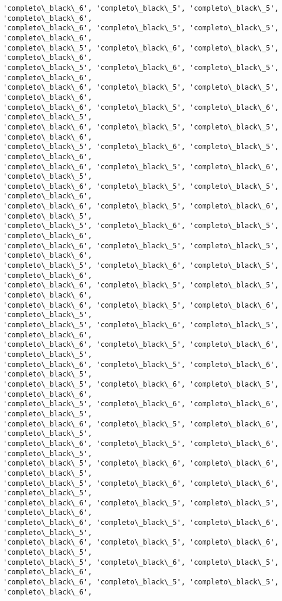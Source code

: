 \documentclass[11pt]{article}
\begin{document}
\begin{Verbatim}[commandchars=\\\{\}]
'completo\_black\_6', 'completo\_black\_5', 'completo\_black\_5', 'completo\_black\_6',
'completo\_black\_6', 'completo\_black\_5', 'completo\_black\_5', 'completo\_black\_6',
'completo\_black\_5', 'completo\_black\_6', 'completo\_black\_5', 'completo\_black\_6',
'completo\_black\_5', 'completo\_black\_6', 'completo\_black\_5', 'completo\_black\_6',
'completo\_black\_6', 'completo\_black\_5', 'completo\_black\_5', 'completo\_black\_6',
'completo\_black\_6', 'completo\_black\_5', 'completo\_black\_6', 'completo\_black\_5',
'completo\_black\_6', 'completo\_black\_5', 'completo\_black\_5', 'completo\_black\_6',
'completo\_black\_5', 'completo\_black\_6', 'completo\_black\_5', 'completo\_black\_6',
'completo\_black\_6', 'completo\_black\_5', 'completo\_black\_6', 'completo\_black\_5',
'completo\_black\_6', 'completo\_black\_5', 'completo\_black\_5', 'completo\_black\_6',
'completo\_black\_6', 'completo\_black\_5', 'completo\_black\_6', 'completo\_black\_5',
'completo\_black\_5', 'completo\_black\_6', 'completo\_black\_5', 'completo\_black\_6',
'completo\_black\_6', 'completo\_black\_5', 'completo\_black\_5', 'completo\_black\_6',
'completo\_black\_5', 'completo\_black\_6', 'completo\_black\_5', 'completo\_black\_6',
'completo\_black\_6', 'completo\_black\_5', 'completo\_black\_5', 'completo\_black\_6',
'completo\_black\_6', 'completo\_black\_5', 'completo\_black\_6', 'completo\_black\_5',
'completo\_black\_5', 'completo\_black\_6', 'completo\_black\_5', 'completo\_black\_6',
'completo\_black\_6', 'completo\_black\_5', 'completo\_black\_6', 'completo\_black\_5',
'completo\_black\_6', 'completo\_black\_5', 'completo\_black\_6', 'completo\_black\_5',
'completo\_black\_5', 'completo\_black\_6', 'completo\_black\_5', 'completo\_black\_6',
'completo\_black\_5', 'completo\_black\_6', 'completo\_black\_6', 'completo\_black\_5',
'completo\_black\_6', 'completo\_black\_5', 'completo\_black\_6', 'completo\_black\_5',
'completo\_black\_6', 'completo\_black\_5', 'completo\_black\_6', 'completo\_black\_5',
'completo\_black\_5', 'completo\_black\_6', 'completo\_black\_6', 'completo\_black\_5',
'completo\_black\_5', 'completo\_black\_6', 'completo\_black\_6', 'completo\_black\_5',
'completo\_black\_6', 'completo\_black\_5', 'completo\_black\_5', 'completo\_black\_6',
'completo\_black\_6', 'completo\_black\_5', 'completo\_black\_6', 'completo\_black\_5',
'completo\_black\_6', 'completo\_black\_5', 'completo\_black\_6', 'completo\_black\_5',
'completo\_black\_5', 'completo\_black\_6', 'completo\_black\_5', 'completo\_black\_6',
'completo\_black\_6', 'completo\_black\_5', 'completo\_black\_5', 'completo\_black\_6',

\end{Verbatim}
\end{document}
